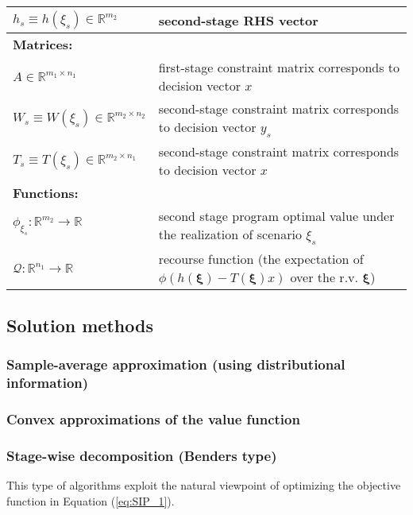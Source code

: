\begin{table}[H]
{\begin{tabular}{ll}
			$h_s\equiv h(\xi_s)\in\mathbb{R}^{m_2}$	& second-stage RHS vector\\ \midrule
			\multicolumn{2}{l}{\textbf{Matrices:}} \\  
			$A\in\mathbb{R}^{m_1\times n_1}$	& first-stage constraint matrix corresponds to decision vector $x$\\
			$W_s\equiv W(\xi_s)\in\mathbb{R}^{m_2\times n_2}$	& second-stage constraint matrix corresponds to decision vector $y_s$\\
			$T_s\equiv T(\xi_s)\in\mathbb{R}^{m_2\times n_1}$	& second-stage constraint matrix corresponds to decision vector $x$\\ \midrule
			\multicolumn{2}{l}{\textbf{Functions:}} \\
			$\phi_{\xi_s}:\mathbb{R}^{m_2}\to\mathbb{R}$	& second stage program optimal value under the realization of scenario $\xi_s$	\\
			$\mathcal{Q}:\mathbb{R}^{n_1}\to\mathbb{R}$	& recourse function (the expectation of $\phi\left( h(\pmb{\xi})-T(\pmb{\xi})x \right)$ over the r.v. $\pmb{\xi}$) 	\\
			\bottomrule
		\end{tabular}
	}
\end{table} 

\subsection{Solution methods}
\subsubsection{Sample-average approximation (using distributional information)}
\subsubsection{Convex approximations of the value function}
\subsubsection{Stage-wise decomposition (Benders type)}
This type of algorithms exploit the natural viewpoint of optimizing the objective function in Equation (\ref{eq:SIP_1}).


